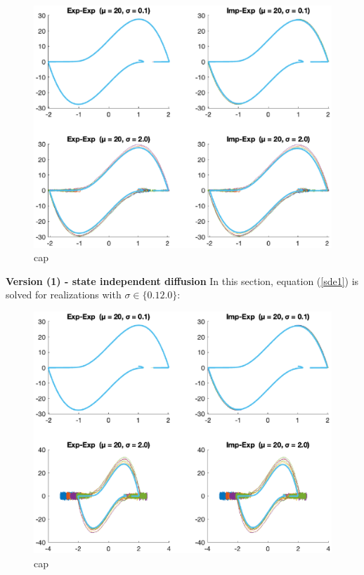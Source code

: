 \begin{figure}
    \centering
    \includegraphics[width=\textwidth]{plots/4a.eps}
    \caption{cap}
    \label{fig:4a}
\end{figure}

\textbf{Version (1) - state independent diffusion}
In this section, equation (\ref{sde1}) is solved for realizations with $\sigma \in \{0.1 2.0\}$:

\begin{figure}
    \centering
    \includegraphics[width=\textwidth]{plots/4c.eps}
    \caption{cap}
    \label{fig:4b}
\end{figure}

